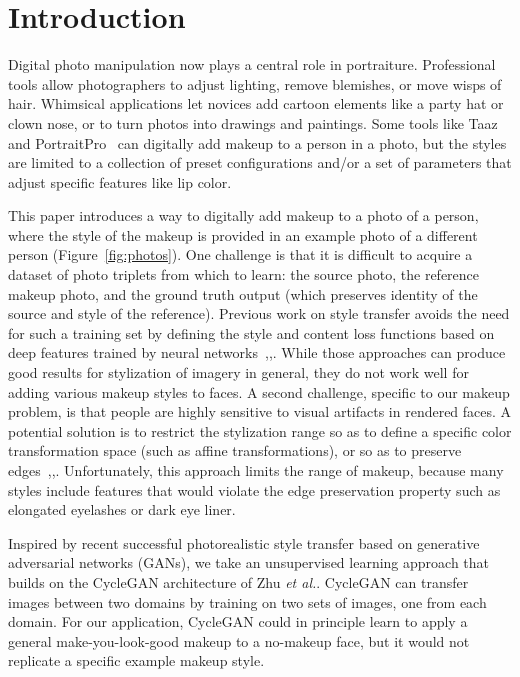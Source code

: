 \documentclass[10pt,twocolumn,letterpaper]{article}
\begin{document}
\section{Introduction}
Digital photo manipulation now plays a central role
in portraiture. Professional tools allow photographers to
adjust lighting, remove blemishes, or move wisps of hair.
Whimsical applications let novices add cartoon elements
like a party hat or clown nose, or to turn photos into
drawings and paintings. Some tools like Taaz~\cite{Taaz-web} and
PortraitPro~\cite{Portrait-web} can digitally add makeup to a person in a
photo, but the styles are limited to a collection of preset
configurations and/or a set of parameters that adjust specific
features like lip color.\par
This paper introduces a way to digitally add makeup to a
photo of a person, where the style of the makeup is provided
in an example photo of a different person (Figure~\ref{fig:photos}). One
challenge is that it is difficult to acquire a dataset of photo
triplets from which to learn: the source photo, the reference
makeup photo, and the ground truth output (which preserves
identity of the source and style of the reference). Previous
work on style transfer avoids the need for such a training
set by defining the style and content loss functions based on
deep features trained by neural networks~\cite{Guo2009Digital},\cite{LiaoYYHK17},\cite{Liu2016Makeup}. While those approaches can produce good results for stylization
of imagery in general, they do not work well for adding
various makeup styles to faces. A second challenge, specific
to our makeup problem, is that people are highly sensitive
to visual artifacts in rendered faces. A potential solution
is to restrict the stylization range so as to define a specific
color transformation space (such as affine transformations),
or so as to preserve edges~\cite{Liu2016Makeup},\cite{LuanPSB17},\cite{LiaoYYHK17}. Unfortunately, this
approach limits the range of makeup, because many styles
include features that would violate the edge preservation
property such as elongated eyelashes or dark eye liner.\par
Inspired by recent successful photorealistic style transfer
based on generative adversarial networks (GANs), we
take an unsupervised learning approach that builds on the
CycleGAN architecture of Zhu \emph{et al.}\cite{ZhuPIE17}. CycleGAN can
transfer images between two domains by training on two
sets of images, one from each domain. For our application, CycleGAN could in principle learn to apply a general
make-you-look-good makeup to a no-makeup face, but it
would not replicate a specific example makeup style.
\end{document}
